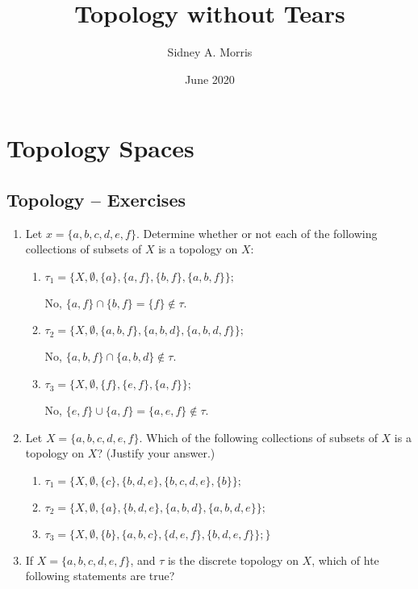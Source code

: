 \documentclass[10pt,a4paper]{report}
\title{Topology without Tears}
\author{Sidney A. Morris}
\date{June 2020}
\begin{document}
\maketitle

\tableofcontents

\chapter{Topology Spaces}
\section{Topology -- Exercises }

\begin{enumerate}
\item Let $x = \{a,b,c,d,e,f\}$.  Determine whether or not each of the following collections of subsets of $X$ is a topology on $X$:
\begin{enumerate}

	\item $\tau_1= \{X, \emptyset, \{a\}, \{a,f\},\{b,f\},\{a,b,f\}\};$
	
	No, $\{a,f\} \cap \{b,f\} = \{f\} \not \in \tau$.
	
	\item $\tau_2 = \{X, \emptyset, \{a,b,f\},\{a,b,d\},\{a,b,d,f\}\};$
	
	No, $\{a,b,f\}\cap\{a,b,d\} \not \in \tau$.
	
	\item $\tau_3 = \{X, \emptyset, \{f\}, \{e,f\}, \{a,f\}\}	;$
	
	No, $\{e,f\} \cup \{a,f\} = \{a,e,f\} \not \in \tau$.
\end{enumerate}

\item Let $X=\{a,b,c,d,e,f\}$.  Which of the following collections of subsets of $X$ is a topology on $X$? (Justify your answer.)

\begin{enumerate}
	\item $\tau_1 = \{X,\emptyset, \{c\},\{b,d,e\}, \{b,c,d,e\}, \{b\}\};$
	\item $\tau_2 = \{X, \emptyset, \{a\}, \{b,d,e\}, \{a,b,d\},\{a,b,d,e\}\};$
	\item $\tau_3 = \{X, \emptyset, \{b\}, \{a,b,c\}, \{d,e,f\}, \{b,d,e,f\}\};\}$
\end{enumerate}

\item If $X=\{a,b,c,d,e,f\}$, and $\tau$ is the discrete topology on $X$, which of hte following statements are true?


\end{enumerate}
\end{document}
